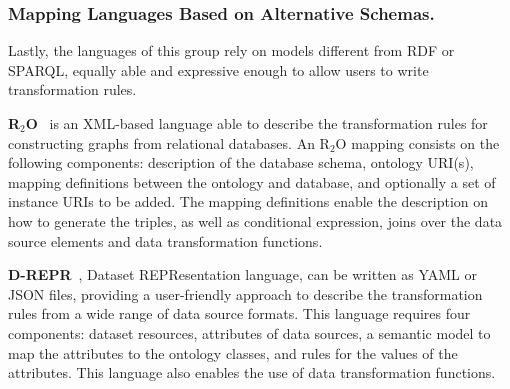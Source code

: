 



\subsubsection{Mapping Languages Based on Alternative Schemas.} 
\label{sec:chp2_alternative-languages}

Lastly, the languages of this group rely on models different from RDF or SPARQL, equally able and expressive enough to allow users to write transformation rules. 


\noindent\textbf{R$_2$O}~\parencite{barrasa2004r2o} is an XML-based language able to describe the transformation rules for constructing graphs from relational databases. %
An R$_2$O mapping consists on the following components: description of the database schema, ontology URI(s), mapping definitions between the ontology and database, and optionally a set of instance URIs to be added. The mapping definitions enable the description on how to generate the triples, as well as conditional expression, joins over the data source elements and data transformation functions. 


\noindent\textbf{D-REPR}~\parencite{Vu2019d-repr}, Dataset REPResentation language, can be written as YAML or JSON files, providing a user-friendly approach to describe the transformation rules from a wide range of data source formats. This language requires four components: dataset resources, attributes of data sources, a semantic model to map the attributes to the ontology classes, and rules for the values of the attributes. This language also enables the use of data transformation functions. 

